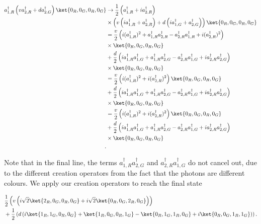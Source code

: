 \begin{align}
a_{1,R}^\dagger\left(v a_{2,R}^\dagger + da_{2,G}^\dagger\right)\ket{0_R,0_G,0_R,0_G} &\rightarrow \frac{1}{2}\left(a_{1,R}^\dagger + ia_{2,R}^\dagger\right)\nonumber\\
&\times\left(v\left(ia_{1,R}^\dagger + a_{2,R}^\dagger\right) + d\left(ia_{1,G}^\dagger + a_{2,G}^\dagger\right)\right)\ket{0_R,0_G,0_R,0_G}\\
&= \frac{v}{2}\left(i(a_{1,R}^\dagger)^2 + a_{1,R}^\dagger a_{2,R}^\dagger - a_{2,R}^\dagger a_{1,R}^\dagger+i(a_{2,R}^\dagger)^2\right)\nonumber\\
&\times\ket{0_R,0_G,0_R,0_G}\nonumber\\
&+\frac{d}{2}\left(ia_{1,R}^\dagger a_{1,G}^\dagger + a_{1,R}^\dagger a_{2,G}^\dagger - a_{2,R}^\dagger a_{1,G}^\dagger+ia_{2,R}^\dagger a_{2,G}^\dagger \right)\nonumber\\
&\times\ket{0_R,0_G,0_R,0_G}\nonumber\\
&= \frac{v}{2}\left(i(a_{1,R}^\dagger)^2 +i(a_{2,R}^\dagger)^2\right)\ket{0_R,0_G,0_R,0_G}\nonumber\\
&+\frac{d}{2}\left(ia_{1,R}^\dagger a_{1,G}^\dagger + a_{1,R}^\dagger a_{2,G}^\dagger - a_{2,R}^\dagger a_{1,G}^\dagger+ia_{2,R}^\dagger a_{2,G}^\dagger \right)\nonumber\\
&\times\ket{0_R,0_G,0_R,0_G}\nonumber\\
&= \frac{v}{2}\left(i(a_{1,R}^\dagger)^2 +i(a_{2,R}^\dagger)^2\right)\ket{0_R,0_G,0_R,0_G}\nonumber\\
&+\frac{d}{2}\left(ia_{1,R}^\dagger a_{1,G}^\dagger + a_{1,R}^\dagger a_{2,G}^\dagger - a_{2,R}^\dagger a_{1,G}^\dagger+ia_{2,R}^\dagger a_{2,G}^\dagger \right)\nonumber\\
&\times\ket{0_R,0_G,0_R,0_G}\\.
\end{align}

Note that in the final line, the terms $a_{1,R}^\dagger a_{2,G}^\dagger$ and $a_{2,R}^\dagger a_{1,G}^\dagger$ do not cancel out, due to the different creation operators from the fact that the photons are different colours. We apply our creation operators to reach the final state

\begin{align}
&\frac{1}{2}\left(v\left(i\sqrt{2}\ket{2_R,0_G,0_R,0_G} +i\sqrt{2}\ket{0_R,0_G,2_R,0_G}\right)\right)\nonumber\\
&+\frac{1}{2}\left( d\left(i\ket{1_R,1_G,0_R,0_G} + \ket{1_R,0_G,0_R,1_G} - \ket{0_R,1_G,1_R,0_G}+i\ket{0_R,0_G,1_R,1_G} \right)\right).
\end{align}

